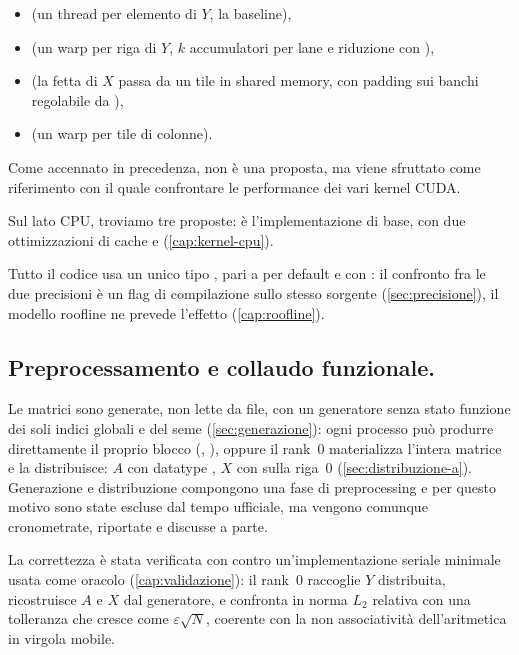 \begin{itemize}
  \item {} (un thread per elemento di $Y$, la baseline),
  \item {} (un warp per riga di $Y$, $k$ accumulatori per lane e riduzione con ),
  \item  {} (la fetta di $X$ passa da un tile in shared memory, con padding sui banchi regolabile da ),
  \item {} (un warp per tile di colonne).

\end{itemize}
Come accennato in precedenza,  non è una proposta, ma viene sfruttato come riferimento
con il quale confrontare le performance dei vari kernel CUDA.

\medskip

Sul lato CPU, troviamo tre proposte:  è l'implementazione
di base, con due ottimizzazioni di cache
 e 
(\cref{cap:kernel-cpu}).

\medskip

Tutto il codice usa un unico tipo , pari a  per default e
 con : il confronto fra le due precisioni è un
flag di compilazione sullo stesso sorgente (\cref{sec:precisione}), il modello
roofline ne prevede l'effetto (\cref{cap:roofline}).

\subsection{Preprocessamento e collaudo funzionale.}
Le matrici sono generate, non lette da file, con un generatore senza stato
funzione dei soli indici globali e del seme (\cref{sec:generazione}): ogni
processo può produrre direttamente il proprio blocco (,
), oppure il rank~0 materializza l'intera matrice e la
distribuisce: $A$ con datatype , $X$ con
 sulla riga~0 (\cref{sec:distribuzione-a}).
Generazione e distribuzione compongono una fase di preprocessing
e per questo motivo sono state escluse dal tempo ufficiale, ma vengono comunque cronometrate, riportate
e discusse a parte.

\medskip 

La correttezza è stata verificata con  contro
un'implementazione seriale minimale usata come oracolo
(\cref{cap:validazione}): il rank~0 raccoglie $Y$ distribuita, ricostruisce
$A$ e $X$ dal generatore, e confronta in norma $L_2$ relativa con una
tolleranza che cresce come $\varepsilon\sqrt{N}$, coerente con la non
associatività dell'aritmetica in virgola mobile.

